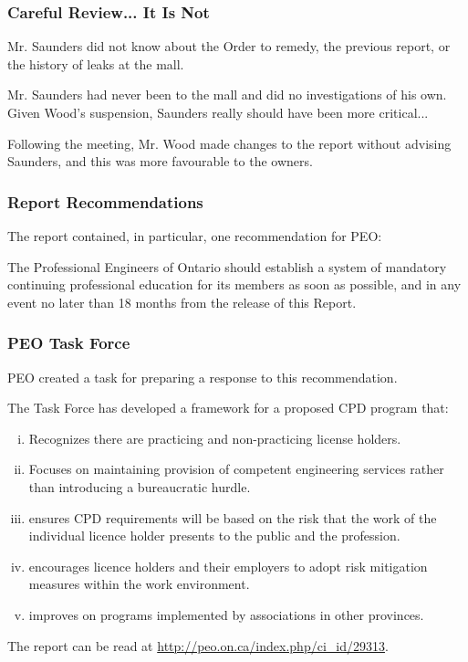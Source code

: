 \begin{frame}
\frametitle{Careful Review... It Is Not}

Mr. Saunders did not know about the Order to remedy, the previous report, or the history of leaks at the mall.

Mr. Saunders had never been to the mall and did no investigations of his own.\\
\quad Given Wood's suspension, Saunders really should have been more critical...

Following the meeting, Mr. Wood made changes to the report without advising Saunders, and this was more favourable to the owners.

\end{frame}



\begin{frame}
\frametitle{Report Recommendations}

The report contained, in particular, one recommendation for PEO:

The Professional Engineers of Ontario should establish a system of mandatory continuing professional education for its members as soon as possible, and in any event no later than 18 months from the release of this Report.

\end{frame}



\begin{frame}
\frametitle{PEO Task Force}

PEO created a task for preparing a response to this recommendation.

The Task Force has developed a framework for a proposed CPD program that:

\begin{enumerate}[i)]
	\item Recognizes there are practicing and non-practicing license holders.
	\item Focuses on maintaining provision of competent engineering services rather than introducing a bureaucratic hurdle.
	\item ensures CPD requirements will be based on the risk that the work of the individual licence holder presents to the public and the profession.
	\item encourages licence holders and their employers to adopt risk mitigation measures within the work environment.
	\item improves on programs implemented by associations in other provinces.
\end{enumerate}

The report can be read at \url{http://peo.on.ca/index.php/ci_id/29313}.

\end{frame}




